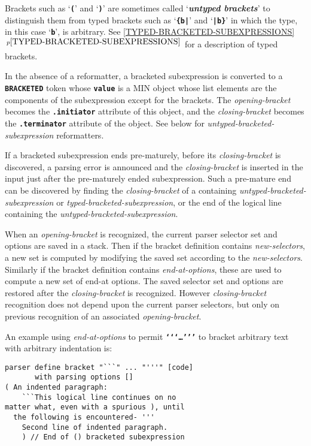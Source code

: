 \documentclass[12pt]{article}
\newcommand{\TT}[1]{{\tt \bfseries #1}}
\newcommand{\key}[1]{{\bf \em #1}\index{#1}}
\newcommand{\itemref}[1]{\ref{#1}$\,^{p\pageref{#1}}$}
\newenvironment{indpar}[1][0.3in]%
	{\begin{list}{}%
		     {\setlength{\itemsep}{0in}%
		      \setlength{\topsep}{0in}%
		      \setlength{\parsep}{1ex}%
		      \setlength{\labelwidth}{#1}%
		      \setlength{\leftmargin}{#1}%
		      \addtolength{\leftmargin}{\labelsep}}%
	 \item}%
	{\end{list}}
\begin{document}
Brackets such as `\TT{(}' and `\TT{)}'
are sometimes called `\key{untyped brackets}'
to distinguish them from typed brackets
such as `\TT{\{b|}' and `\TT{|b\}}'
in which the type, in this case `\TT{b}',
is arbitrary.  See \itemref{TYPED-BRACKETED-SUBEXPRESSIONS}
for a description of typed brackets.

In the absence of a reformatter,
a bracketed subexpression is converted to a \TT{BRACKETED}
token whose \TT{value} is a
MIN object whose list elements are the components of the
subexpression except for the brackets.  The
{\em opening-bracket} becomes the \TT{.initiator}
attribute of this object, and the {\em closing-bracket}
becomes the \TT{.terminator} attribute of the object.
See below for {\em untyped-bracketed-subexpression} reformatters.

If a bracketed subexpression ends pre-maturely, before
its {\em closing-bracket} is discovered, a parsing error is
announced and the {\em closing-bracket} is inserted in the input
just after the pre-maturely ended subexpression.  Such a pre-mature end can be
discovered by finding the {\em closing-bracket} of a containing
{\em untyped-bracketed-subexpression} or {\em typed-bracketed-subexpression},
or the end of the logical line
containing the {\em untyped-bracketed-subexpression}.

When an {\em opening-bracket} is recognized, the current parser
selector set and options are saved in a stack.  Then if the
bracket definition contains {\em new-selectors},
a new set is computed by modifying the saved set
according to the {\em new-selectors}.
Similarly if the bracket definition contains {\em end-at-options},
these are used to compute a new set of end-at options.
The saved selector set and options are restored after the {\em closing-bracket}
is recognized.  However {\em closing-bracket}
recognition does not depend
upon the current parser selectors, but only on previous recognition
of an associated {\em opening-bracket}.

An example using {\em end-at-options} to permit
\TT{`{}`{}`\ldots'{}'{}'}
to bracket arbitrary text with arbitrary indentation is:
\begin{indpar}\begin{verbatim}
parser define bracket "```" ... "'''" [code]
       with parsing options []
( An indented paragraph:
    ```This logical line continues on no
matter what, even with a spurious ), until
  the following is encountered- '''
    Second line of indented paragraph.
    ) // End of () bracketed subexpression
\end{verbatim}\end{indpar}
\end{document}
